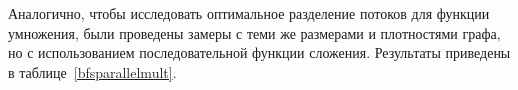 \begin{table}[h]
\centering
    \caption{Сравнение производительности параллельного и обычного Bfs на графах с малым количеством вершин.}
    \label{bfscomparison}
\end{table}

Аналогично, чтобы исследовать оптимальное разделение потоков для функции умножения, были проведены замеры с теми же размерами и плотностями графа, но с использованием последовательной функции сложения. Результаты приведены в таблице~\ref{bfsparallelmult}.

